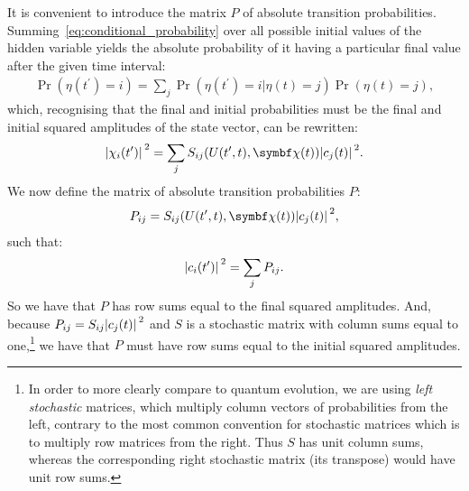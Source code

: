 It is convenient to introduce the matrix $P$ of absolute transition probabilities. Summing~\eqref{eq:conditional_probability} over all possible initial values of the hidden variable yields the absolute probability of it having a particular final value after the given time interval:
\begin{align}
\Pr(\eta(t^\prime){=}i) 
= \sum_j \Pr(\eta(t^\prime){=}i|\eta(t){=}j) \Pr(\eta(t){=}j),
\end{align}
which, recognising that the final and initial probabilities must be the final and initial squared amplitudes of the state vector, can be rewritten:
\begin{align}
\abs{\chi_i(t^\prime)}^2
= \sum_j S_{ij}(U(t^\prime, t), \vec\chi(t)) \abs{c_j(t)}^2.
\end{align}
We now define the matrix of absolute transition probabilities $P$:
\begin{align}\label{eq:P_matrix_def}
P_{ij} = S_{ij}(U(t^\prime, t), \vec\chi(t)) \abs{c_j(t)}^2,
\end{align}
such that:
\begin{align}
\abs{c_i(t^\prime)}^2
= \sum_j P_{ij}.
\end{align}
So we have that $P$ has row sums equal to the final squared amplitudes.
And, because $P_{ij} = S_{ij}\abs{c_j(t)}^2$ and $S$ is a stochastic matrix with column sums equal to one,\footnote{In order to more clearly compare to quantum evolution, we are using \emph{left stochastic} matrices, which multiply column vectors of probabilities from the left, contrary to the most common convention for stochastic matrices which is to multiply row matrices from the right. Thus $S$ has unit column sums, whereas the corresponding right stochastic matrix (its transpose) would have unit row sums.} we have that $P$ must have row sums equal to the initial squared amplitudes.

